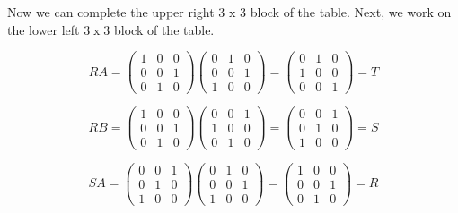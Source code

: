 \documentclass[12pt]{article}
\begin{document}
Now we can complete the upper right 3 x 3 block of the table.  Next, we work on the lower left $3\operatorname{x}3$ block of the table.

\begin{displaymath}
RA= \left( \begin{array}{ccc}
1 & 0 & 0 \\
0 & 0 & 1 \\
0 & 1 & 0
\end{array} \right )
\left( \begin{array}{ccc}
0 & 1 & 0 \\
0 & 0 & 1 \\
1 & 0 & 0
\end{array} \right )=
\left( \begin{array}{ccc}
0 & 1 & 0 \\
1 & 0 & 0 \\
0 & 0 & 1
\end{array} \right )=T
\end{displaymath}

\begin{displaymath}
RB= \left( \begin{array}{ccc}
1 & 0 & 0 \\
0 & 0 & 1 \\
0 & 1 & 0
\end{array} \right )
\left( \begin{array}{ccc}
0 & 0 & 1 \\
1 & 0 & 0 \\
0 & 1 & 0
\end{array} \right )=
\left( \begin{array}{ccc}
0 & 0 & 1 \\
0 & 1 & 0 \\
1 & 0 & 0
\end{array} \right )=S
\end{displaymath}

\begin{displaymath}
SA= \left( \begin{array}{ccc}
0 & 0 & 1 \\
0 & 1 & 0 \\
1 & 0 & 0
\end{array} \right )
\left( \begin{array}{ccc}
0 & 1 & 0 \\
0 & 0 & 1 \\
1 & 0 & 0
\end{array} \right )=
\left( \begin{array}{ccc}
1 & 0 & 0 \\
0 & 0 & 1 \\
0 & 1 & 0
\end{array} \right )=R
\end{displaymath}
\end{document}
